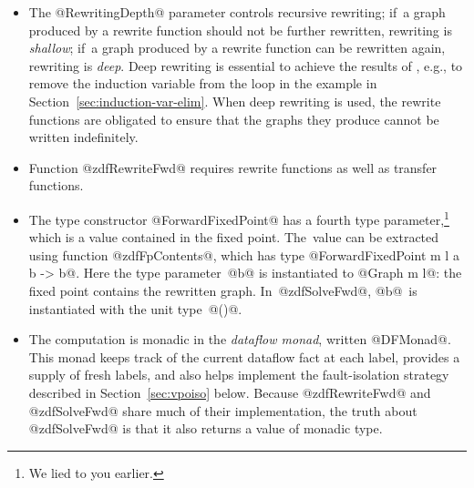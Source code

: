 \documentclass[blockstyle,preprint,natbib,nocopyrightspace]{sigplanconf}
\newcommand{\authornote}[1]{{\em #1}}
\def\authornote#1{\unskip\relax}
\newcommand{\simon}[1]{\authornote{SLPJ: #1}}
\newcommand\secref[1]{Section~\ref{sec:#1}}
\newcommand\seclabel[1]{\label{sec:#1}}
\begin{document}
\begin{itemize}
\item
The @RewritingDepth@ parameter controls recursive rewriting;
if~a graph produced by a rewrite function should not be further rewritten,
rewriting is \emph{shallow};
if~a graph produced by a rewrite function can be rewritten again,
rewriting is \emph{deep}.
Deep rewriting is essential to achieve the results of
\citet{lerner-grove-chambers:2002}, e.g., to remove the induction
variable from the loop in the example in \secref{induction-var-elim}.
When deep rewriting is used, the rewrite functions are obligated to
ensure that the graphs they produce cannot be written indefinitely.
\item
Function @zdfRewriteFwd@ requires rewrite functions as well as transfer
functions.
\item
The type constructor @ForwardFixedPoint@ has a fourth
type parameter,\footnote
{We lied to you earlier.}
which is a value contained in the fixed point.
The~value can be extracted using function @zdfFpContents@, which has
type @ForwardFixedPoint m l a b -> b@.
Here the type parameter~@b@ is instantiated to @Graph m l@: the fixed point
contains the rewritten graph.
In~@zdfSolveFwd@, @b@~is instantiated with
the unit type~@()@.
\item
The computation is monadic in the \emph{dataflow monad}, written
@DFMonad@.
This monad keeps track of the current dataflow fact at each label,
provides a supply of fresh labels, 
and
also helps implement the fault-isolation strategy described
in \secref{vpoiso} below.
Because @zdfRewriteFwd@ and @zdfSolveFwd@ share much of their
implementation, the truth 
about @zdfSolveFwd@ is that it also returns a value of monadic type.
\end{itemize}


\seclabel{dfengine-spec}
\end{document}
